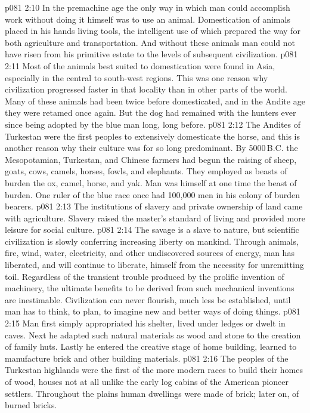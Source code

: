 \vs p081 2:10 \pc In the premachine age the only way in which man could accomplish work without doing it himself was to use an animal. Domestication of animals placed in his hands living tools, the intelligent use of which prepared the way for both agriculture and transportation. And without these animals man could not have risen from his primitive estate to the levels of subsequent civilization.
\vs p081 2:11 Most of the animals best suited to domestication were found in Asia, especially in the central to south\hyp{}west regions. This was one reason why civilization progressed faster in that locality than in other parts of the world. Many of these animals had been twice before domesticated, and in the Andite age they were retamed once again. But the dog had remained with the hunters ever since being adopted by the blue man long, long before.
\vs p081 2:12 The Andites of Turkestan were the first peoples to extensively domesticate the horse, and this is another reason why their culture was for so long predominant. By 5000\,B.C. the Mesopotamian, Turkestan, and Chinese farmers had begun the raising of sheep, goats, cows, camels, horses, fowls, and elephants. They employed as beasts of burden the ox, camel, horse, and yak. Man was himself at one time the beast of burden. One ruler of the blue race once had 100,000 men in his colony of burden bearers.
\vs p081 2:13 \pc The institutions of slavery and private ownership of land came with agriculture. Slavery raised the master’s standard of living and provided more leisure for social culture.
\vs p081 2:14 The savage is a slave to nature, but scientific civilization is slowly conferring increasing liberty on mankind. Through animals, fire, wind, water, electricity, and other undiscovered sources of energy, man has liberated, and will continue to liberate, himself from the necessity for unremitting toil. Regardless of the transient trouble produced by the prolific invention of machinery, the ultimate benefits to be derived from such mechanical inventions are inestimable. Civilization can never flourish, much less be established, until man has  to think, to plan, to imagine new and better ways of doing things.
\vs p081 2:15 \pc Man first simply appropriated his shelter, lived under ledges or dwelt in caves. Next he adapted such natural materials as wood and stone to the creation of family huts. Lastly he entered the creative stage of home building, learned to manufacture brick and other building materials.
\vs p081 2:16 The peoples of the Turkestan highlands were the first of the more modern races to build their homes of wood, houses not at all unlike the early log cabins of the American pioneer settlers. Throughout the plains human dwellings were made of brick; later on, of burned bricks.
